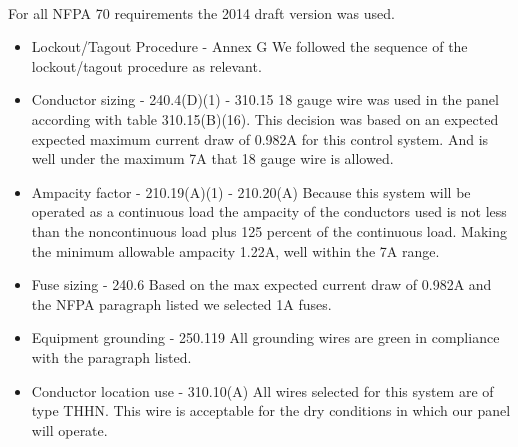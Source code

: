 \paragraph{} For all NFPA 70 requirements the 2014 draft version was used.

\begin{itemize}
	\item Lockout/Tagout Procedure - Annex G {\newline} {\indent}
	      We followed the sequence of the lockout/tagout procedure as relevant.
	\item Conductor sizing - 240.4(D)(1) - 310.15 {\newline} {\indent}
	      18 gauge wire was used in the panel according with table 310.15(B)(16).
	      This decision was based on an  expected expected maximum current draw of 0.982A for this control system.
	      And is well under the maximum 7A that 18 gauge wire is allowed.
	\item Ampacity factor - 210.19(A)(1) - 210.20(A) {\newline} {\indent}
	      Because this system will be operated as a continuous load the ampacity of the conductors used is not less
	      than the noncontinuous load plus 125 percent of the continuous load. Making the minimum allowable ampacity
	      1.22A, well within the 7A range.
	\item Fuse sizing - 240.6 {\newline} {\indent}
	      Based on the max expected current draw of 0.982A and the NFPA paragraph listed we selected 1A fuses.
	\item Equipment grounding - 250.119 {\newline} {\indent}
	      All grounding wires are green in compliance with the paragraph listed.
	\item Conductor location use - 310.10(A) {\newline} {\indent}
	      All wires selected for this system are of type THHN. This wire is acceptable for the dry conditions in which
	      our panel will operate.
\end{itemize}
